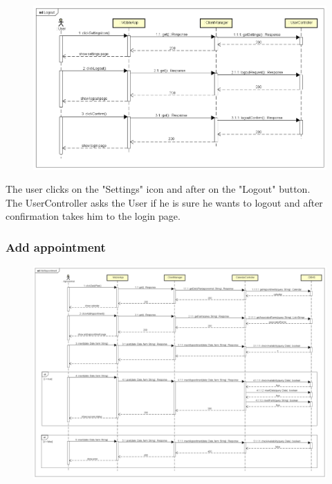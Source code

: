 \begin{figure}[H]
    \begin{center}
        \includegraphics[width=\textwidth]{Images/SequenceDiagrams/LogoutDD.png}
    \end{center}
\end{figure}

The user clicks on the "Settings" icon and after on the "Logout" button. \\
The UserController asks the User if he is sure he wants to logout and after confirmation takes him to the login page.


\newpage
\subsubsection{Add appointment}

\begin{figure}[H]
    \begin{center}
        \includegraphics[width=\textwidth]{Images/SequenceDiagrams/AddAppointmentDD.png}
    \end{center}
\end{figure}

